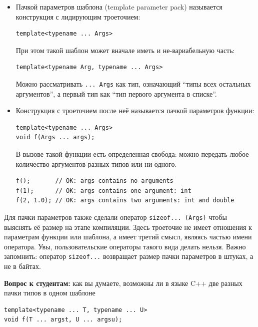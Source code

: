\documentclass[a4paper,12pt,oneside]{article}
\begin{document}
\begin{itemize}
\item
Пачкой параметров шаблона (template parameter pack) называется конструкция с лидирующим троеточием:

\begin{lstlisting}
template<typename ... Args>
\end{lstlisting}

При этом такой шаблон может вначале иметь и не-вариабельную часть:

\begin{lstlisting}
template<typename Arg, typename ... Args>
\end{lstlisting}

Можно рассматривать \lstinline!... Args! как тип, означающий ``типы всех остальных аргументов'', а первый тип как ``тип первого аргумента в списке''.

\item
Конструкция с троеточием после неё называется пачкой параметров функции:

\begin{lstlisting}
template<typename ... Args>
void f(Args ... args);
\end{lstlisting}

В вызове такой функции есть определенная свобода: можно передать любое количество аргументов разных типов или ни одного.

\begin{lstlisting}
f();       // OK: args contains no arguments
f(1);      // OK: args contains one argument: int
f(2, 1.0); // OK: args contains two arguments: int and double
\end{lstlisting}
\end{itemize}

Для пачки параметров также сделали оператор \lstinline!sizeof... (Args)! чтобы выяснять её размер на этапе компиляции. Здесь троеточие не имеет отношения к параметрам функции или шаблона, а имеет третий смысл, являясь частью имени оператора. Увы, пользовательские операторы такого вида делать нельзя. Важно запомнить: оператор \lstinline!sizeof...! возвращает размер пачки параметров в штуках, а не в байтах.

\textbf{Вопрос к студентам:} как вы думаете, возможны ли в языке C++ две разных пачки типов в одном шаблоне

\begin{lstlisting}
template<typename ... T, typename ... U>
void f(T ... argst, U ... argsu);
\end{lstlisting}
\end{document}
